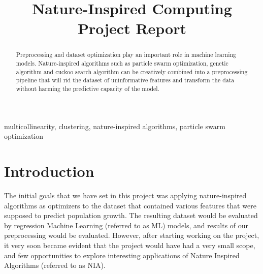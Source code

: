 \documentclass[conference]{IEEEtran}
\begin{document}
\title{Nature-Inspired Computing\\Project Report\\}

\author{
\and
{}
\and
{}
}

\maketitle

\begin{abstract}
Preprocessing and dataset optimization play an important role in machine learning models. Nature-inspired algorithms such as particle swarm optimization, genetic algorithm and cuckoo search algorithm can be creatively combined into a preprocessing pipeline that will rid the dataset of uninformative features and transform the data without harming the predictive capacity of the model.
\end{abstract}

\begin{IEEEkeywords}
multicollinearity, clustering, nature-inspired algorithms, particle swarm optimization
\end{IEEEkeywords}

\section{Introduction}

The initial goals that we have set in this project was applying nature-inspired algorithms as optimizers to the dataset that contained various features that were supposed to predict population growth. The resulting dataset would be evaluated by regression Machine Learning (referred to as ML) models, and results of our preprocessing would be evaluated. However, after starting working on the project, it very soon became evident that the project would have had a very small scope, and few opportunities to explore interesting applications of Nature Inspired Algorithms (referred to as NIA). \\ 
\end{document}
